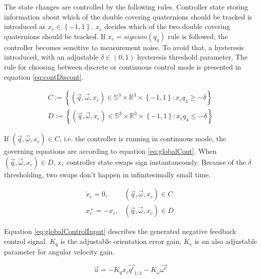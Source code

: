 The state changes are controlled by the following rules. Controller state storing information about which of the double covering quaternions should be tracked is introduced as $x_c \in  \left\lbrace -1,1 \right\rbrace $. $x_c$ decides which of the two double covering quaternions should be tracked. If $x_c = signum(q_4)$ rule is followed, the controller becomes sensitive to measurement noise. To avoid that, a hysteresis introduced, with an adjustable $\delta  \in (0,1)$ hysteresis threshold parameter. The rule for choosing between discrete or continuous control mode is presented in equation \ref{eq:contDiscont}.

\begin{align}
\label{eq:contDiscont}
C:= \left\lbrace (\vec{q},\vec{\omega},x_c) \in \mathbb{S}^3 \times \mathbb{R}^3 \times \left\lbrace -1,1 \right\rbrace : x_c q_4 \geq -\delta \right\rbrace  \\
\nonumber D:= \left\lbrace (\vec{q},\vec{\omega},x_c) \in \mathbb{S}^3 \times \mathbb{R}^3 \times \left\lbrace -1,1 \right\rbrace : x_cq_4 \leq -\delta \right\rbrace 
\end{align}

If $(\vec{q},\vec{\omega},x_c) \in C$, i.e. the controller is running in continuous mode, the governing equations are according to equation \ref{eq:globalCont}. When $(\vec{q},\vec{\omega},x_c) \in D$, $x_c$ controller state swaps sign instantaneously. Because of the $\delta$ thresholding, two swaps don't happen in infinitesimally small time.  

\begin{align}
	\label{eq:globalCont}
\dot{x}_c = 0, & (\vec{q},\vec{\omega},x_c)  \in C \\
\label{eq:globalDiscont}
x_c^+ = -x_c, & (\vec{q},\vec{\omega},x_c) \in D\
\end{align}

Equation \ref{eq:globalControlInput} describes the generated negative feedback control signal. $K_q$ is the adjustable orientation error gain, $K_e$ is an also adjustable parameter for angular velocity gain.

\begin{equation}
\label{eq:globalControlInput}
\vec{u} = -K_q x_c \vec{q^e}_{1:3} -K_\omega \vec{\omega^e}
\end{equation}



